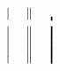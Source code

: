 \documentclass{article}
\begin{document}
	$\begin{array}{*{17}c}
  \arrowvert &
  \Arrowvert &
  \bracevert  
	\\[4pt]
  \Bigg\arrowvert &
	\Bigg\Arrowvert &
	\Bigg\bracevert
	\end{array}$
\end{document}
